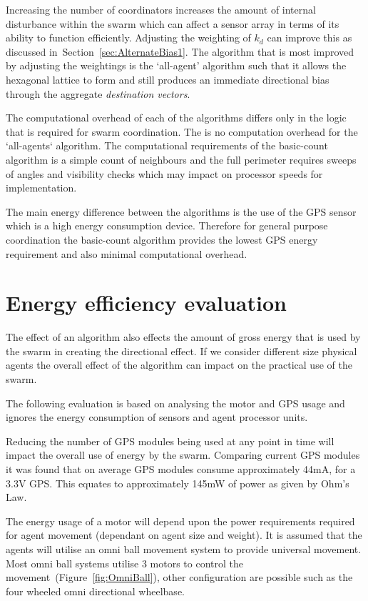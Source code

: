 \documentclass{ieeeaccess}
\begin{document}
Increasing the number of coordinators increases the amount of internal disturbance within the swarm which can affect a sensor array in terms of its ability to function efficiently. Adjusting the weighting of $k_d$ can improve this as discussed in~Section~\ref{sec:AlternateBias1}. The algorithm that is most improved by adjusting the weightings is the `all-agent' algorithm such that it allows the hexagonal lattice to form and still produces an immediate directional bias through the aggregate \textit{destination vectors}.  

The computational overhead of each of the algorithms differs only in the logic that is required for swarm coordination. The is no computation overhead for the `all-agents` algorithm. The computational requirements of the basic-count algorithm is a simple count of neighbours and the full perimeter requires sweeps of angles and visibility checks which may impact on processor speeds for implementation. 

The main energy difference between the algorithms is the use of the GPS sensor which is a high energy consumption device. Therefore for general purpose coordination the basic-count algorithm provides the lowest GPS energy requirement and also minimal computational overhead.

\section{Energy efficiency evaluation}\label{sec:EnergyReductionGPS}
The effect of an algorithm also effects the amount of gross energy that is used by the swarm in creating the directional effect. If we consider different size physical agents the overall effect of the algorithm can impact on the practical use of the swarm.

The following evaluation is based on analysing the motor and GPS usage and ignores the energy consumption of sensors and agent processor units.

Reducing the number of GPS modules being used at any point in time will impact the overall use of energy by the swarm. Comparing current GPS modules it was found that on average GPS modules consume approximately 44mA, for a 3.3V GPS. This equates to approximately 145mW of power as given by Ohm's Law. 


The energy usage of a motor will depend upon the power requirements required for agent movement (dependant on agent size and weight). It is assumed that the agents will utilise an omni ball movement system to provide universal movement. Most omni ball systems utilise 3 motors to control the movement~(Figure~\ref{fig:OmniBall}), other configuration are possible such as the four wheeled omni directional wheelbase\cite{PD:06}.
\end{document}
